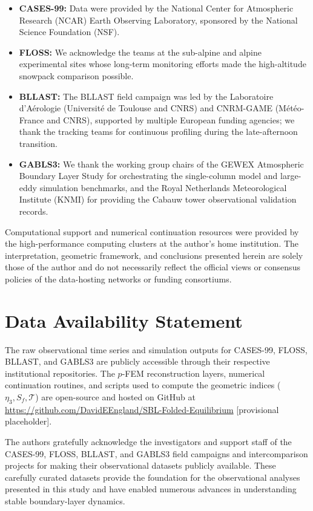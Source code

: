 \documentclass[12pt,a4paper]{article}
\begin{document}
\begin{itemize}
  \item \textbf{CASES-99:} Data were provided by the National Center for Atmospheric Research (NCAR) Earth Observing Laboratory, sponsored by the National Science Foundation (NSF).
  \item \textbf{FLOSS:} We acknowledge the teams at the sub-alpine and alpine experimental sites whose long-term monitoring efforts made the high-altitude snowpack comparison possible.
  \item \textbf{BLLAST:} The BLLAST field campaign was led by the Laboratoire d'Aérologie (Université de Toulouse and CNRS) and CNRM-GAME (Météo-France and CNRS), supported by multiple European funding agencies; we thank the tracking teams for continuous profiling during the late-afternoon transition.
  \item \textbf{GABLS3:} We thank the working group chairs of the GEWEX Atmospheric Boundary Layer Study for orchestrating the single-column model and large-eddy simulation benchmarks, and the Royal Netherlands Meteorological Institute (KNMI) for providing the Cabauw tower observational validation records.
\end{itemize}

\noindent Computational support and numerical continuation resources were provided by the high-performance computing clusters at the author's home institution. The interpretation, geometric framework, and conclusions presented herein are solely those of the author and do not necessarily reflect the official views or consensus policies of the data-hosting networks or funding consortiums.

\section*{Data Availability Statement}
The raw observational time series and simulation outputs for CASES-99, FLOSS, BLLAST, and GABLS3 are publicly accessible through their respective institutional repositories.
The $p$-FEM reconstruction layers, numerical continuation routines, and scripts used to compute the geometric indices ($\eta_3, S_f, \mathcal{T}$) are open-source and hosted on GitHub at \url{https://github.com/DavidEEngland/SBL-Folded-Equilibrium} [provisional placeholder].

The authors gratefully acknowledge the investigators and support staff of the CASES-99, FLOSS, BLLAST, and GABLS3 field campaigns and intercomparison projects for making their observational datasets publicly available. These carefully curated datasets provide the foundation for the observational analyses presented in this study and have enabled numerous advances in understanding stable boundary-layer dynamics.
\end{document}
